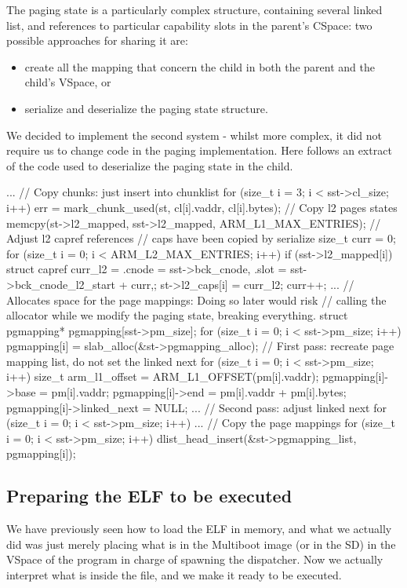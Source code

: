 \documentclass[a4paper,twoside,openright]{report}
\begin{document}
The paging state is a particularly complex structure, containing several linked list, and references to particular capability slots in the parent's CSpace: two possible approaches for sharing it are:
\begin{itemize}
	\item create all the mapping that concern the child in both the parent and the child's VSpace, or
	\item serialize and deserialize the paging state structure.
\end{itemize}

We decided to implement the second system - whilst more complex, it did not require us to change code in the paging implementation. Here follows an extract of the code used to deserialize the paging state in the child.
\begin{pandacode}

...
// Copy chunks: just insert into chunklist
for (size_t i = 3; i < sst->cl_size; i++) 
	err = mark_chunk_used(st, cl[i].vaddr, cl[i].bytes);
// Copy l2 pages states 
memcpy(st->l2_mapped, sst->l2_mapped, ARM_L1_MAX_ENTRIES);
// Adjust l2 capref references
// caps have been copied by serialize
size_t curr = 0;
for (size_t i = 0; i < ARM_L2_MAX_ENTRIES; i++) {
	if (sst->l2_mapped[i]) {
		struct capref curr_l2 = { .cnode = sst->bck_cnode,
			.slot = sst->bck_cnode_l2_start + curr,};
		st->l2_caps[i] = curr_l2; curr++;
		...}}
// Allocates space for the page mappings: Doing so later would risk 
// calling the allocator while we modify the paging state, breaking everything.
struct pgmapping* pgmapping[sst->pm_size];
for (size_t i = 0; i < sst->pm_size; i++) {
	pgmapping[i] = slab_alloc(&st->pgmapping_alloc); }
// First pass: recreate page mapping list, do not set the linked next
for (size_t i = 0; i < sst->pm_size; i++) {
	size_t arm_l1_offset = ARM_L1_OFFSET(pm[i].vaddr);
	pgmapping[i]->base = pm[i].vaddr;
	pgmapping[i]->end = pm[i].vaddr + pm[i].bytes;
	pgmapping[i]->linked_next = NULL;
	...}
// Second pass: adjust linked next
for (size_t i = 0; i < sst->pm_size; i++) 
	...
// Copy the page mappings
for (size_t i = 0; i < sst->pm_size; i++) {
	dlist_head_insert(&st->pgmapping_list, pgmapping[i]); }

\end{pandacode}

\subsection{Preparing the ELF to be executed}
We have previously seen how to load the ELF in memory, and what we actually did was just merely placing what is in the Multiboot image (or in the SD) in the VSpace of the program in charge of spawning the dispatcher.
Now we actually interpret what is inside the file, and we make it ready to be executed.
\end{document}
